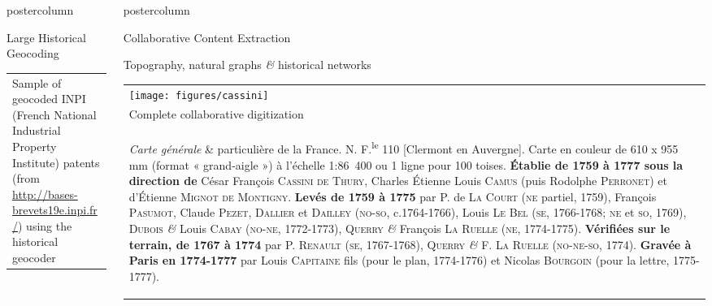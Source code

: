 \documentclass[final,hyperref={pdfpagelabels=false}]{beamer}
\let\oldcite=\cite
\renewcommand{\cite}[1]{\textcolor{ta3chameleon}{\oldcite{#1}}}
\begin{document}
\begin{frame}
\begin{columns}
\begin{column}{0.5\textwidth}
\begin{beamercolorbox}[center,wd=\textwidth]{postercolumn}
\begin{minipage}[t]{.98\textwidth}
\begin{block}{Large Historical Geocoding}
\begin{tabular}{>{\centering}m{}}
        \scriptsize Sample of geocoded INPI (French National Industrial Property Institute) patents (from \url{http://bases-brevets19e.inpi.fr/}) using the historical geocoder~\cite{Cura2018}
      \end{tabular}
    \end{block}
    \end{minipage}
    \end{beamercolorbox}
    \end{column}
    \begin{column}{0.5\textwidth}
    \begin{beamercolorbox}[center,wd=\textwidth]{postercolumn}
    \begin{minipage}[t]{.98\textwidth}
      \begin{block}{Collaborative Content Extraction}
        \centering
        \begin{flushleft}
          Topography, natural graphs \textit{\&} historical networks~\cite{Perret2015_,Perret2015Data_}
        \end{flushleft}
        \begin{tabular}{p{}}
	  \centering\texttt{[image: figures/cassini]} \\
          \scriptsize
            Complete collaborative digitization\\
          \begin{flushleft}
            \tiny{
            \textit{Carte générale} \& particulière de la France.
            N\degree 52. F.\textsuperscript{le} 110 [Clermont en Auvergne].
            Carte en couleur de 610 x 955 mm (format « grand-aigle ») à l'échelle 1:86~400 ou 1 ligne pour 100 toises.
            \textbf{Établie de 1759 à 1777 sous la direction de} César François \textsc{Cassini de Thury}, Charles Étienne Louis \textsc{Camus} (puis Rodolphe \textsc{Perronet}) et d’Étienne \textsc{Mignot de Montigny}.
            \textbf{Levés de 1759 à 1775} par P. de \textsc{La Court} (\textsc{ne} partiel, 1759), François \textsc{Pasumot}, Claude \textsc{Pezet}, \textsc{Dallier} et \textsc{Dailley} (\textsc{no-so}, c.1764-1766), Louis \textsc{Le Bel} (\textsc{se}, 1766-1768; \textsc{ne} et \textsc{so}, 1769), \textsc{Dubois} \textit{\&} Louis \textsc{Cabay} (\textsc{no-ne}, 1772-1773), \textsc{Querry} \textit{\&} François \textsc{La Ruelle} (\textsc{ne}, 1774-1775).
            \textbf{Vérifiées sur le terrain, de 1767 à 1774} par P. \textsc{Renault} (\textsc{se}, 1767-1768), \textsc{Querry} \textit{\&} F. \textsc{La Ruelle} (\textsc{no-ne-so}, 1774). \textbf{Gravée à Paris en 1774-1777} par Louis \textsc{Capitaine} fils (pour le plan, 1774-1776) et Nicolas \textsc{Bourgoin} (pour la lettre, 1775-1777).
}
\end{flushleft}
\end{tabular}
\end{block}
\end{minipage}
\end{beamercolorbox}
\end{column}
\end{columns}
\end{frame}
\end{document}
